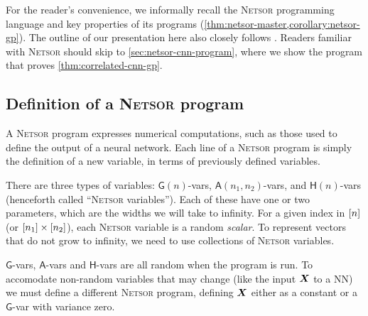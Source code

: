 \documentclass[accepted]{uai2021} %
\newcommand{\Netsor}{\textsc{Netsor}\xspace}
\newcommand{\Gva}{\mathsf{G}}
\newcommand{\Hva}{\mathsf{H}}
\newcommand{\Ava}{\mathsf{A}}
\newcommand{\0}{\boldsymbol{0}}
\newcommand{\1}{\boldsymbol{1}}
\newcommand{\crefp}[1]{(\cref{#1})}
\begin{document}
For the reader's convenience, we informally recall the \Netsor programming language
\citep{yang2019wide} and key properties of its programs \crefp{thm:netsor-master,corollary:netsor-gp}.
The outline of our presentation here also closely follows
\citet{yang2019wide}. Readers familiar with \Netsor should skip to
\cref{sec:netsor-cnn-program}, where we show the program that proves \cref{thm:correlated-cnn-gp}.


\subsection{Definition of a \Netsor program}\label{sec:netsor-programming}
A \Netsor program expresses numerical computations, such as those used to define the output of a neural network. Each line of a \Netsor program is simply the definition of a new variable, in terms of previously defined variables.

There are three types of variables: $\Gva(n)$-vars, $\Ava(n_1, n_2)$-vars, and
$\Hva(n)$-vars (henceforth called ``\Netsor variables''). Each of these have one
or two parameters, which are the widths we will take to infinity. For a given
index in $[n]$ (or $[n_1] \times [n_2]$), each \Netsor
variable is a random \emph{scalar}. To represent vectors that do not grow to
infinity, we need to use collections of \Netsor variables.

$\Gva$-vars, $\Ava$-vars and $\Hva$-vars are all random when the program is run. To accomodate non-random variables that may change (like the input ${\bm{X}}$ to a \ac{NN}) we must define a different \Netsor program, defining ${\bm{X}}$ either as a constant or a $\Gva$-var with variance zero.
\end{document}
